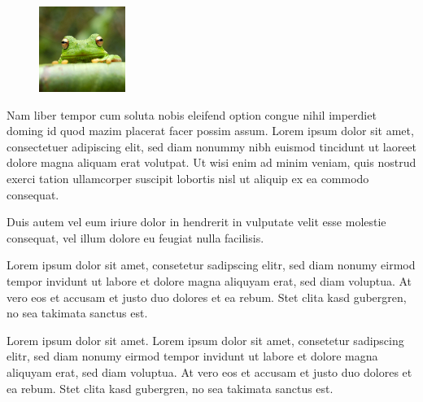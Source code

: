 \documentclass[11pt]{scrartcl}
\begin{document}
\begin{figure}
	\centering 
	\includegraphics[width=0.25\textwidth]{frog}
\end{figure}

Nam liber tempor cum soluta nobis eleifend option congue nihil imperdiet doming id quod mazim placerat facer possim assum. Lorem ipsum dolor sit amet, consectetuer adipiscing elit, sed diam nonummy nibh euismod tincidunt ut laoreet dolore magna aliquam erat volutpat. Ut wisi enim ad minim veniam, quis nostrud exerci tation ullamcorper suscipit lobortis nisl ut aliquip ex ea commodo consequat.   

Duis autem vel eum iriure dolor in hendrerit in vulputate velit esse molestie consequat, vel illum dolore eu feugiat nulla facilisis.  

Lorem ipsum dolor sit amet, consetetur sadipscing elitr, sed diam nonumy eirmod tempor invidunt ut labore et dolore magna aliquyam erat, sed diam voluptua. At vero eos et accusam et justo duo dolores et ea rebum. Stet clita kasd gubergren, no sea takimata sanctus est.

Lorem ipsum dolor sit amet. Lorem ipsum dolor sit amet, consetetur sadipscing elitr, sed diam nonumy eirmod tempor invidunt ut labore et dolore magna aliquyam erat, sed diam voluptua. At vero eos et accusam et justo duo dolores et ea rebum. Stet clita kasd gubergren, no sea takimata sanctus est.
\end{document}
